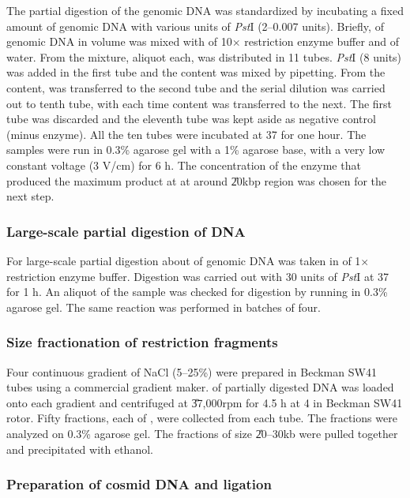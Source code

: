 The partial digestion of the genomic DNA was standardized by
incubating a fixed amount of genomic DNA with various units of
\emph{Pst}I (2--0.007 units). Briefly,  of genomic DNA in
 volume was mixed with  of 10$\times$ restriction
enzyme buffer and  of water. From the mixture, 
aliquot each, was distributed in 11 tubes. \emph{Pst}I (8 units)
was added in the first tube and the content was mixed by
pipetting. From the content,  was transferred to the
second tube and the serial dilution was carried out to tenth tube,
with each time  content was transferred to the next. The
first tube was discarded and the eleventh tube was kept aside as
negative control (minus enzyme). All the ten tubes were incubated
at 37\dg{} for one hour. The samples were run in 0.3\% agarose gel
with a 1\% agarose base, with a very low constant voltage (3 V/cm)
for 6 h. The concentration of the enzyme that produced the maximum
product at at around \U{20}{kbp} region was chosen for the next
step.

\subsubsection{Large-scale partial digestion of DNA}

For large-scale partial digestion about  of genomic DNA
was taken in  of 1$\times$ restriction enzyme buffer.
Digestion was carried out with 30 units of \emph{Pst}I at 37\dg{}
for 1 h. An aliquot of the sample was checked for digestion by
running in 0.3\% agarose gel. The same reaction was performed in
batches of four.

\subsubsection{Size fractionation of restriction fragments}

Four  continuous gradient of NaCl (5--25\%) were prepared
in Beckman SW41 tubes using a commercial gradient maker. 
of partially digested DNA was loaded onto each gradient and
centrifuged at \U{37,000}{rpm} for 4.5 h at 4\dg{} in Beckman SW41
rotor. Fifty fractions, each of , were collected from
each tube. The fractions were analyzed on 0.3\% agarose gel. The
fractions of size \U{20--30}{kb} were pulled together and
precipitated with ethanol.

\subsubsection{Preparation of cosmid DNA and ligation}

